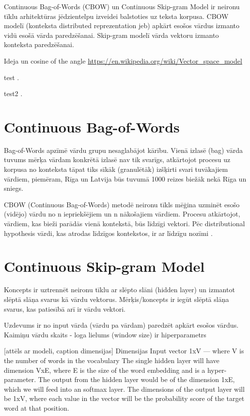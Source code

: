 Continuous Bag-of-Words (CBOW) un Continuous Skip-gram Model ir neironu tīklu arhitektūras jēdzientelpu izveidei balstoties uz teksta korpusa. CBOW modelī (konteksta distributed reprezentation jeb) apkārt esošos vārdus izmanto vidū esošā vārda paredzēšanai. Skip-gram modelī vārda vektoru izmanto konteksta paredzēšanai.

Ideja un cosine of the angle
\url{https://en.wikipedia.org/wiki/Vector_space_model}

test
\cite{word2vec2013}.

test2 \cite{mikolov2013exploiting}.


\section{Continuous Bag-of-Words}

Bag-of-Words apzīmē vārdu grupu nesaglabājot kārību. Vienā izlasē (bag) vārda tuvums mērķa vārdam konkrētā izlasē nav tik svarīgs, atkārtojot procesu uz korpusa no konteksta tāpat tiks sīkāk (granulētāk) izšķirti svari tuvākajiem vārdiem, piemēram, Rīga un Latvija būs tuvumā 1000 reizes biežāk nekā Rīga un sniegs.

CBOW (Continuous Bag-of-Words) metodē neironu tīkls mēģina uzminēt esošo (vidējo) vārdu no n iepriekšējiem un n nākošajiem vārdiem. Procesu atkārtojot, vārdiem, kas bieži parādās vienā kontekstā, būs līdzīgi vektori. Pēc distributional hypothesis vārdi, kas atrodas līdzīgos kontekstos, ir ar līdzīgu nozīmi \cite{word2vec2013}.


\section{Continuous Skip-gram Model}


Koncepts ir uztrennēt neironu tīklu ar slēpto slāni (hidden layer) un izmantot slēptā slāņa svarus kā vārdu vektorus.
Mērķis/koncepts ir iegūt slēptā slāņa svarus, kas patiesībā arī ir vārdu vektori.

Uzdevums ir no input vārda (vārdu pa vārdam) paredzēt apkārt esošos vārdus. Kaimiņu vārdu skaits - loga lielums (window size) ir hiperparametrs

[attēls ar modeli, caption dimensijas]
Dimensijas
Input vector 1xV — where V is the number of words in the vocabulary
The single hidden layer will have dimension VxE, where E is the size of the word embedding and is a hyper-parameter.
The output from the hidden layer would be of the dimension 1xE, which we will feed into an softmax layer.
The dimensions of the output layer will be 1xV, where each value in the vector will be the probability score of the target word at that position.

